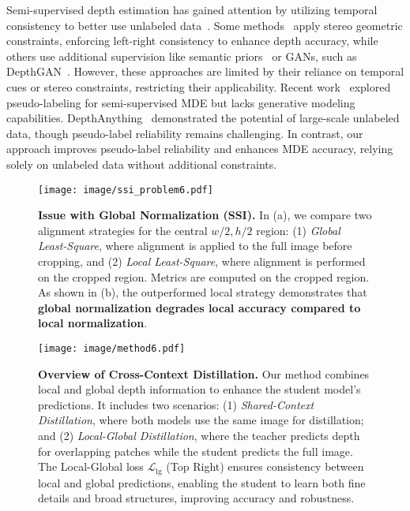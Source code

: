 Semi-supervised depth estimation has gained attention by utilizing temporal consistency to better use unlabeled data~\cite{kuznietsov2017semi, guizilini2020robust}. Some methods~\cite{left_right, smolyanskiy2018importance, cho2019large, yang2018deep, monodepth2} apply stereo geometric constraints, enforcing left-right consistency to enhance depth accuracy, while others use additional supervision like semantic priors~\cite{ramirez2018geometry,hoyer2023improving} or GANs, such as DepthGAN~\cite{gandepth}. However, these approaches are limited by their reliance on temporal cues or stereo constraints, restricting their applicability. Recent work~\cite{petrovai2022exploiting} explored pseudo-labeling for semi-supervised MDE but lacks generative modeling capabilities. DepthAnything~\cite{yang2024depthanything} demonstrated the potential of large-scale unlabeled data, though pseudo-label reliability remains challenging. In contrast, our approach improves pseudo-label reliability and enhances MDE accuracy, relying solely on unlabeled data without additional constraints.

\begin{figure}[t]
    \centering  \texttt{[image: image/ssi\_problem6.pdf]}
    \caption{
    \textbf{Issue with Global Normalization (SSI).} 
    In (a), we compare two alignment strategies for the central \( w/2, h/2 \) region: (1) \textit{Global Least-Square}, where alignment is applied to the full image before cropping, and (2) \textit{Local Least-Square}, where alignment is performed on the cropped region. Metrics are computed on the cropped region. As shown in (b), 
    the outperformed local strategy demonstrates
    that \textbf{global normalization degrades local accuracy compared to local normalization}.
    }
    \label{fig:normalization}
\end{figure}

\begin{figure*}[!t]
    \centering    \texttt{[image: image/method6.pdf]}
    \vspace{-1em}
    \caption{
    \textbf{Overview of Cross-Context Distillation.} 
    Our method combines local and global depth information to enhance the student model’s predictions. It includes two scenarios: (1) \textit{Shared-Context Distillation}, where both models use the same image for distillation;
    and (2) \textit{Local-Global Distillation}, where the teacher predicts depth for overlapping patches while the student predicts the full image. The Local-Global loss $\mathcal{L}_{\text{lg}}$ (Top Right) ensures consistency between local and global predictions, enabling the student to learn both fine details and broad structures, improving accuracy and robustness.
    }
    \vspace{-1em}
    \label{fig:method}
\end{figure*}